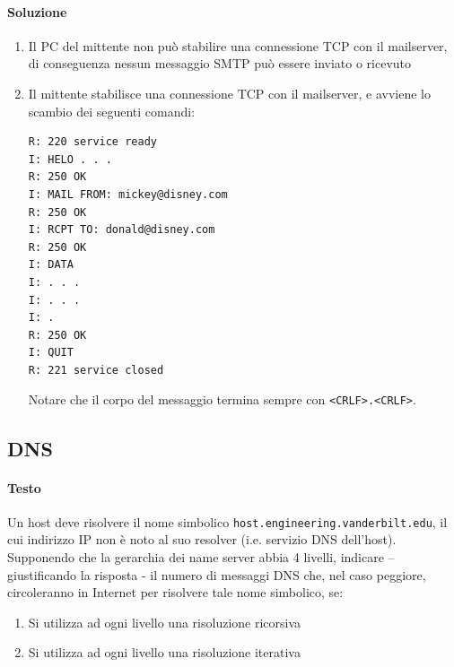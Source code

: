 \documentclass[10pt]{article}
\begin{document}
{\paragraph{Soluzione}
\begin{enumerate}
\item Il PC del mittente non può stabilire una connessione TCP con il mailserver, di conseguenza nessun messaggio SMTP può essere inviato o ricevuto
\item Il mittente stabilisce una connessione TCP con il mailserver, e avviene lo scambio dei seguenti comandi:
\begin{verbatim}
R: 220 service ready
I: HELO . . .
R: 250 OK
I: MAIL FROM: mickey@disney.com
R: 250 OK
I: RCPT TO: donald@disney.com
R: 250 OK
I: DATA
I: . . .
I: . . .
I: .
R: 250 OK
I: QUIT
R: 221 service closed
\end{verbatim}
Notare che il corpo del messaggio termina sempre con \texttt{<CRLF>.<CRLF>}.
\end{enumerate}
\pagebreak
\subsection{DNS}
\paragraph{Testo} Un host deve risolvere il nome simbolico \texttt{host.engineering.vanderbilt.edu}, il cui indirizzo IP non è noto al suo resolver (i.e. servizio DNS dell’host).\\
Supponendo che la gerarchia dei name server abbia 4 livelli, indicare – giustificando la risposta - il numero di messaggi DNS che, nel caso peggiore, circoleranno in Internet per risolvere tale nome
simbolico, se:
\begin{enumerate}
\item Si utilizza ad ogni livello una risoluzione ricorsiva
\item Si utilizza ad ogni livello una risoluzione iterativa
\end{enumerate}
}
\end{document}
